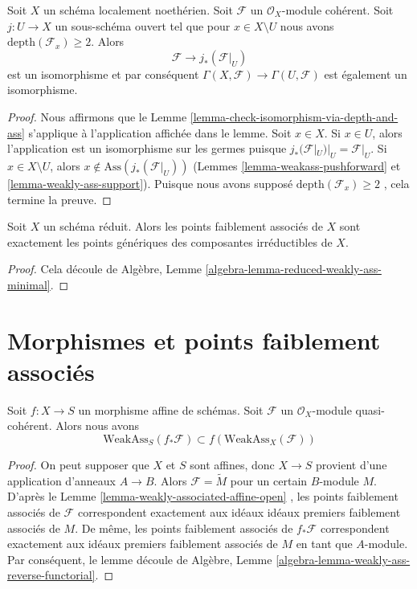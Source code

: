 \begin{lemma}
\label{lemma-depth-2-hartog}
Soit  $X$  un schéma localement noethérien. Soit  $\mathcal{F}$  un
 $\mathcal{O}_X$-module cohérent. Soit  $j : U \to X$  un sous-schéma ouvert tel que pour
 $x \in X \setminus U$  nous avons  $\text{depth}(\mathcal{F}_x) \geq 2$. Alors
$$
\mathcal{F} \longrightarrow j_*(\mathcal{F}|_U)
$$
est un isomorphisme et par conséquent  $\Gamma(X, \mathcal{F}) \to \Gamma(U, \mathcal{F})$  est également un isomorphisme.
\end{lemma}

\begin{proof}
Nous affirmons que le Lemme  \ref{lemma-check-isomorphism-via-depth-and-ass}  s'applique à l'application affichée dans le
lemme. Soit  $x \in X$. Si  $x \in U$, alors l'application est un isomorphisme sur
les germes puisque  $j_*(\mathcal{F}|_U)|_U = \mathcal{F}|_U$. Si  $x \in X \setminus U$, alors  $x \not \in \text{Ass}(j_*(\mathcal{F}|_U))$  (Lemmes
 \ref{lemma-weakass-pushforward}  et  \ref{lemma-weakly-ass-support}). Puisque nous avons supposé  $\text{depth}(\mathcal{F}_x) \geq 2$ , cela
termine la preuve.
\end{proof}

\begin{lemma}
\label{lemma-weakass-reduced}
Soit  $X$  un schéma réduit. Alors les points faiblement associés de
 $X$  sont exactement les points génériques des composantes irréductibles
de  $X$.
\end{lemma}

\begin{proof}
Cela découle de Algèbre, Lemme  \ref{algebra-lemma-reduced-weakly-ass-minimal}.
\end{proof}



\section{Morphismes et points faiblement associés}
\label{section-morphisms-weakly-associated}

\begin{lemma}
\label{lemma-weakly-ass-reverse-functorial}
Soit  $f : X \to S$  un morphisme affine de schémas. Soit  $\mathcal{F}$  un
 $\mathcal{O}_X$-module quasi-cohérent. Alors nous avons
$$
\text{WeakAss}_S(f_*\mathcal{F}) \subset f(\text{WeakAss}_X(\mathcal{F}))
$$
\end{lemma}

\begin{proof}
On peut supposer que  $X$  et  $S$  sont affines, donc  $X \to S$ 
provient d'une application d'anneaux  $A \to B$. Alors  $\mathcal{F} = \widetilde M$  pour un
certain  $B$-module  $M$. D'après le Lemme  \ref{lemma-weakly-associated-affine-open} , les
points faiblement associés de  $\mathcal{F}$  correspondent exactement aux idéaux
idéaux premiers faiblement associés de  $M$. De même, les points
faiblement associés de  $f_*\mathcal{F}$  correspondent exactement aux idéaux
premiers faiblement associés de  $M$  en tant que  $A$-module. Par
conséquent, le lemme découle de Algèbre, Lemme  \ref{algebra-lemma-weakly-ass-reverse-functorial}.
\end{proof}

